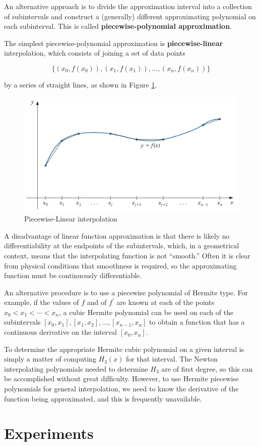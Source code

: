 \documentclass[preprint,12pt]{elsarticle}
\begin{document}
An alternative approach is to divide the approximation interval into a collection of subintervals and construct a (generally) different approximating polynomial on each subinterval. This is called \textbf{piecewise-polynomial approximation}.

The simplest piecewise-polynomial approximation is \textbf{piecewise-linear} interpolation, which consists of joining a set of data points 

$$\{(x_0,f(x_0)),(x_1,f(x_1)),\dots,(x_n,f(x_n))\}$$

by a series of straight lines, as shown in Figure \ref{fig:intro_pw1}.

\begin{figure}
\centering\includegraphics[width=0.4\linewidth]{piecewise_linear.png}
\caption{Piecewise-Linear interpolation}
\label{fig:intro_pw1}
\end{figure}

A disadvantage of linear function approximation is that there is likely no differentiability at the endpoints of the subintervals, which, in a geometrical context, means that the interpolating function is not “smooth.” Often it is clear from physical conditions that smoothness is required, so the approximating function must be continuously differentiable.

An alternative procedure is to use a piecewise polynomial of Hermite type. For example, if the values of $f$ and of $f^{'}$ are known at each of the points $x_{0}<x_{1}<\cdots<x_{n}$, a cubic Hermite polynomial can be used on each of the subintervals $[x_0,x_1],[x_1,x_2],\dots,[x_{n−1},x_n]$ to obtain a function that has a continuous derivative on the interval $[x_0,x_n]$.

To determine the appropriate Hermite cubic polynomial on a given interval is simply a matter of computing $H_3(x)$ for that interval. The Newton interpolating polynomials needed to determine $H_3$ are of first degree, so this can be accomplished without great difﬁculty. However, to use Hermite piecewise polynomials for general interpolation, we need to know the derivative of the function being approximated, and this is frequently unavailable.

\section{Experiments}
\label{S:3}
\end{document}
